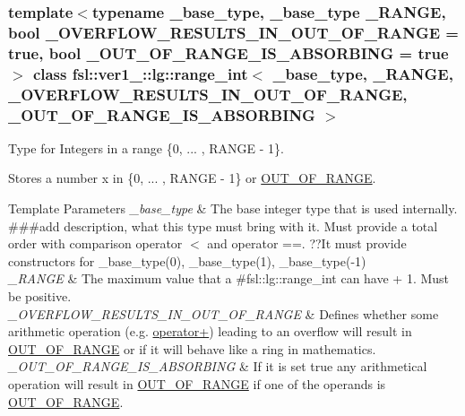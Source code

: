 \subsubsection*{template$<$typename \+\_\+base\+\_\+type, \+\_\+base\+\_\+type \+\_\+\+R\+A\+N\+GE, bool \+\_\+\+O\+V\+E\+R\+F\+L\+O\+W\+\_\+\+R\+E\+S\+U\+L\+T\+S\+\_\+\+I\+N\+\_\+\+O\+U\+T\+\_\+\+O\+F\+\_\+\+R\+A\+N\+GE = true, bool \+\_\+\+O\+U\+T\+\_\+\+O\+F\+\_\+\+R\+A\+N\+G\+E\+\_\+\+I\+S\+\_\+\+A\+B\+S\+O\+R\+B\+I\+NG = true$>$\newline
class fsl\+::ver1\+\_\+::lg\+::range\+\_\+int$<$ \+\_\+base\+\_\+type, \+\_\+\+R\+A\+N\+G\+E, \+\_\+\+O\+V\+E\+R\+F\+L\+O\+W\+\_\+\+R\+E\+S\+U\+L\+T\+S\+\_\+\+I\+N\+\_\+\+O\+U\+T\+\_\+\+O\+F\+\_\+\+R\+A\+N\+G\+E, \+\_\+\+O\+U\+T\+\_\+\+O\+F\+\_\+\+R\+A\+N\+G\+E\+\_\+\+I\+S\+\_\+\+A\+B\+S\+O\+R\+B\+I\+N\+G $>$}

Type for Integers in a range \{0, ... , R\+A\+N\+GE -\/ 1\}. 

Stores a number x in \{0, ... , R\+A\+N\+GE -\/ 1\} or \mbox{\hyperlink{classfsl_1_1ver1__0_1_1lg_1_1range__int_a690eec0614992c007017ea852bb58210}{O\+U\+T\+\_\+\+O\+F\+\_\+\+R\+A\+N\+GE}}. 
\begin{DoxyTemplParams}{Template Parameters}
{\em \+\_\+base\+\_\+type} & The base integer type that is used internally. \#\#\#add description, what this type must bring with it. Must provide a total order with comparison operator $<$ and operator ==. ??It must provide constructors for \+\_\+base\+\_\+type(0), \+\_\+base\+\_\+type(1), \+\_\+base\+\_\+type(-\/1) \\
\hline
{\em \+\_\+\+R\+A\+N\+GE} & The maximum value that a \#fsl\+::lg\+::range\+\_\+int can have + 1. Must be positive. \\
\hline
{\em \+\_\+\+O\+V\+E\+R\+F\+L\+O\+W\+\_\+\+R\+E\+S\+U\+L\+T\+S\+\_\+\+I\+N\+\_\+\+O\+U\+T\+\_\+\+O\+F\+\_\+\+R\+A\+N\+GE} & Defines whether some arithmetic operation (e.\+g. \mbox{\hyperlink{classfsl_1_1ver1__0_1_1lg_1_1range__int_aa2c1e9553dae1b9858d307b6faaee489}{operator+}}) leading to an overflow will result in \mbox{\hyperlink{classfsl_1_1ver1__0_1_1lg_1_1range__int_a690eec0614992c007017ea852bb58210}{O\+U\+T\+\_\+\+O\+F\+\_\+\+R\+A\+N\+GE}} or if it will behave like a ring in mathematics. \\
\hline
{\em \+\_\+\+O\+U\+T\+\_\+\+O\+F\+\_\+\+R\+A\+N\+G\+E\+\_\+\+I\+S\+\_\+\+A\+B\+S\+O\+R\+B\+I\+NG} & If it is set true any arithmetical operation will result in \mbox{\hyperlink{classfsl_1_1ver1__0_1_1lg_1_1range__int_a690eec0614992c007017ea852bb58210}{O\+U\+T\+\_\+\+O\+F\+\_\+\+R\+A\+N\+GE}} if one of the operands is \mbox{\hyperlink{classfsl_1_1ver1__0_1_1lg_1_1range__int_a690eec0614992c007017ea852bb58210}{O\+U\+T\+\_\+\+O\+F\+\_\+\+R\+A\+N\+GE}}. \\
\hline
\end{DoxyTemplParams}


